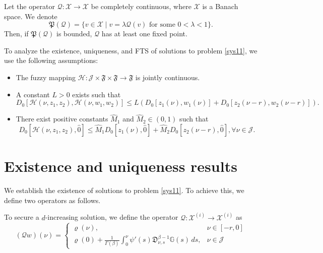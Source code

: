 \documentclass[reqno]{amsart}
\begin{document}
\begin{theorem} \label{theo3}
Let the operator $\mathcal{Q}: \mathcal{X} \to \mathcal{X}$ be completely continuous, 
where $\mathcal{X}$ is a Banach space. We denote
$$
\mathfrak{P}(\mathcal{Q})=\{v \in \mathcal{X}
\mid v=\lambda \mathcal{Q}(v) \text { for some } 0<\lambda<1\} .
$$
Then, if $\mathfrak{P}(\mathcal{Q})$ is bounded, $\mathcal{Q}$ has at least one fixed 
point.
\end{theorem}


To analyze the existence, uniqueness, and FTS of solutions to problem \eqref{sys11}, 
we use the following assumptions:
\begin{itemize}
\item[(A1)] The fuzzy mapping \(\mathcal{H} : \mathcal{J} \times \mathfrak{F} 
\times \mathfrak{F} \to \mathfrak{F}\) is jointly continuous.

\item[(A2)] A constant \(L > 0\) exists such that
$$
D_0[\mathcal{H}(\nu , z_{1}, z_{2}), \mathcal{H}(\nu , w_{1}, w_{2})] \leq L(D_0[z_{1}(\nu ), w_{1}(\nu )]+D_0[z_{2}(\nu - r), w_{2}(\nu - r)]).
$$

\item[(A3)] There exist positive constants $\hat{M}_{1}$ and $\hat{M}_{2} \in(0,1)$ 
such that
$$
D_0[\mathcal{H}(\nu , z_{1}, z_{2}), \hat{0}] \leq \hat{M}_{1} D_0[z_{1}(\nu ), \hat{0}]+\hat{M}_{2} D_0[z_{2}(\nu - r), \hat{0}], \forall \nu \in\mathcal{J}.
$$
\end{itemize}

\section{Existence and uniqueness results}
We establish the existence of solutions to problem \eqref{sys11}. 
To achieve this, we define two operators as follows.

To secure a \(d\)-increasing solution, we define the operator 
\(\mathcal{Q} : \mathcal{X}^{(i)} \to \mathcal{X}^{(i)}\) as
\begin{equation} \label{sys31}
(\mathcal{Q} w)(\nu )=\begin{cases}
\varrho(\nu ), & \nu \in[- r, 0] \tag{3.1}\\
\varrho(0)+\frac{1}{\Gamma(\beta)} \int_0^{\nu }
\psi'(s)\mathfrak{D}_{\nu ,s}^{\beta-1} \mathbb{G}(s)\,ds, & \nu \in\mathcal{J}
\end{cases}
\end{equation}
\end{document}

